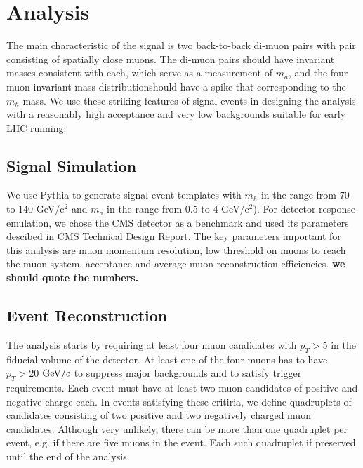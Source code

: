 \documentclass[aps,12pt,superscriptaddress,nofootinbib,floatfix,showpacs]{revtex4}
\begin{document}
\section{Analysis}

The main characteristic of the signal is two back-to-back di-muon pairs with pair consisting of 
spatially close muons. The di-muon pairs should have invariant masses consistent with each, which
serve as a measurement of $m_a$, and the four muon invariant mass distributionshould have a spike 
that corresponding to the $m_h$ mass. We use these striking features of signal events in designing 
the analysis with a reasonably high acceptance and very low backgrounds suitable for early LHC running.

\subsection{Signal Simulation}
We use Pythia to generate signal event templates with $m_h$ in the range from 70 to 140 GeV/c$^2$
and $m_a$  in the range from 0.5 to 4 GeV/c$^2$). For detector response emulation, we chose the CMS 
detector as a benchmark and used its parameters descibed in CMS Technical Design Report. The key 
parameters important for this analysis are muon momentum resolution, low threshold on muons to 
reach the muon system, acceptance and average muon reconstruction efficiencies. {\bf we should quote 
the numbers.} 

\subsection{Event Reconstruction}
The analysis starts by requiring at least four muon candidates with $p_T>5$ \gevc in the fiducial volume of the
detector. At least one of the four muons has to have $p_T>20$ $\mbox{${\rm GeV}/c$}$ to suppress major backgrounds and to 
satisfy trigger requirements. Each event must have at least two muon candidates of positive and negative 
charge each. In events satisfying these critiria, we define quadruplets of candidates consisting of two 
positive and two negatively charged muon candidates. Although very unlikely, there can be more than one 
quadruplet per event, e.g. if there are five muons in the event. Each such quadruplet if preserved until the
end of the analysis.
\end{document}

